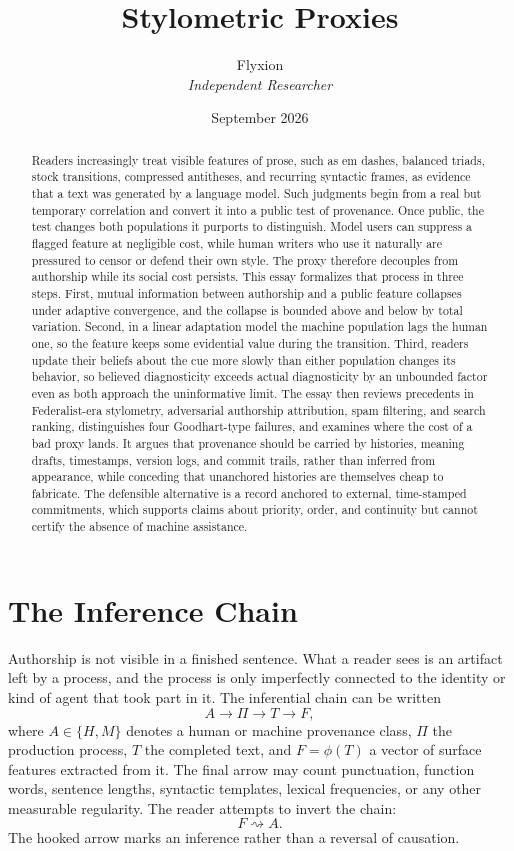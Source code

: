 \documentclass[11pt]{article}
\title{Stylometric Proxies}
\author{Flyxion\\\textit{Independent Researcher}}
\date{September 2026}
\theoremstyle{plain}
\theoremstyle{definition}
\theoremstyle{remark}
\begin{document}
\maketitle

\begin{abstract}
Readers increasingly treat visible features of prose, such as em dashes, balanced triads, stock transitions, compressed antitheses, and recurring syntactic frames, as evidence that a text was generated by a language model. Such judgments begin from a real but temporary correlation and convert it into a public test of provenance. Once public, the test changes both populations it purports to distinguish. Model users can suppress a flagged feature at negligible cost, while human writers who use it naturally are pressured to censor or defend their own style. The proxy therefore decouples from authorship while its social cost persists. This essay formalizes that process in three steps. First, mutual information between authorship and a public feature collapses under adaptive convergence, and the collapse is bounded above and below by total variation. Second, in a linear adaptation model the machine population lags the human one, so the feature keeps some evidential value during the transition. Third, readers update their beliefs about the cue more slowly than either population changes its behavior, so believed diagnosticity exceeds actual diagnosticity by an unbounded factor even as both approach the uninformative limit. The essay then reviews precedents in Federalist-era stylometry, adversarial authorship attribution, spam filtering, and search ranking, distinguishes four Goodhart-type failures, and examines where the cost of a bad proxy lands. It argues that provenance should be carried by histories, meaning drafts, timestamps, version logs, and commit trails, rather than inferred from appearance, while conceding that unanchored histories are themselves cheap to fabricate. The defensible alternative is a record anchored to external, time-stamped commitments, which supports claims about priority, order, and continuity but cannot certify the absence of machine assistance.
\end{abstract}

\section{The Inference Chain}

Authorship is not visible in a finished sentence. What a reader sees is an artifact left by a process, and the process is only imperfectly connected to the identity or kind of agent that took part in it. The inferential chain can be written
\[
A \longrightarrow \Pi \longrightarrow T \longrightarrow F,
\]
where $A\in\{H,M\}$ denotes a human or machine provenance class, $\Pi$ the production process, $T$ the completed text, and $F=\phi(T)$ a vector of surface features extracted from it. The final arrow may count punctuation, function words, sentence lengths, syntactic templates, lexical frequencies, or any other measurable regularity. The reader attempts to invert the chain:
\[
F \rightsquigarrow A.
\]
The hooked arrow marks an inference rather than a reversal of causation.
\end{document}
